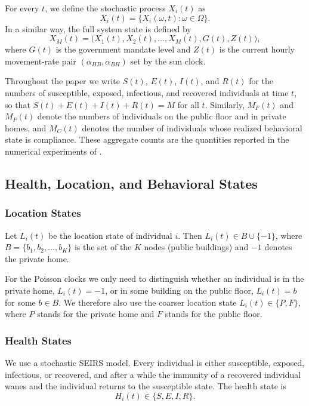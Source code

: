 \documentclass[11pt]{article}
\theoremstyle{definition}
\theoremstyle{plain}
\begin{document}
For every \(t\), we define the stochastic process \(X_i(t)\) as
\[
X_i(t)=\{X_i(\omega,t):\omega\in\Omega\}.
\]
In a similar way, the full system state is defined by
\[
X_M(t)
=
\big(X_1(t),X_2(t),\ldots,X_M(t),G(t),Z(t)\big),
\]
where \(G(t)\) is the government mandate level and \(Z(t)\) is the current hourly movement-rate pair $(\alpha_{HB},\alpha_{BH})$ set by the sun clock.

Throughout the paper we write $S(t)$, $E(t)$, $I(t)$, and $R(t)$ for the numbers of susceptible, exposed, infectious, and recovered individuals at time $t$, so that $S(t)+E(t)+I(t)+R(t)=M$ for all $t$. Similarly, $M_F(t)$ and $M_P(t)$ denote the numbers of individuals on the public floor and in private homes, and $M_C(t)$ denotes the number of individuals whose realized behavioral state is compliance. These aggregate counts are the quantities reported in the numerical experiments of .


\subsection{Health, Location, and Behavioral States}
\label{sec:states}

\subsubsection{Location States}

Let $L_i(t)$ be the location state of individual $i$. Then $L_i(t) \in B \cup \{-1\}$, where $B = \{b_1, b_2, \ldots ,b_K\}$ is the set of the $K$ nodes (public buildings) and $-1$ denotes the private home.

For the Poisson clocks we only need to distinguish whether an individual is in the private home, $L_i(t) = -1$, or in some building on the public floor, $L_i(t) = b$ for some $b \in B$. We therefore also use the coarser location state $L_i(t) \in \{P,F\}$, where $P$ stands for the private home and $F$ stands for the public floor.

\subsubsection{Health States}

We use a stochastic SEIRS model. Every individual is either susceptible, exposed, infectious, or recovered, and after a while the immunity of a recovered individual wanes and the individual returns to the susceptible state. The health state is
\[
H_i(t) \in \{S, E, I ,R \}.
\]
\end{document}
